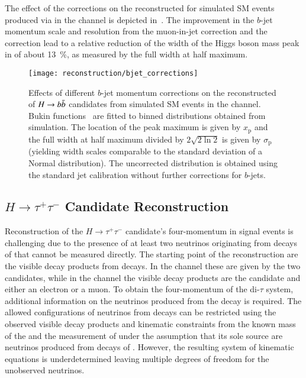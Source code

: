 The effect of the corrections on the reconstructed \mBB for simulated
SM \HH events produced via \ggF in the \hadhad channel is depicted
in~. The improvement in the $b$-jet
momentum scale and resolution from the muon-in-jet correction and the
\pTreco correction lead to a relative reduction of the width of the
Higgs boson mass peak in \mBB of about \SI{13}{\percent}, as measured
by the full width at half maximum.

\begin{figure}[htbp]
  \centering

  \texttt{[image: reconstruction/bjet\_corrections]}

  \caption{Effects of different $b$-jet momentum corrections on the
    reconstructed \mBB of $H \to b\bar{b}$ candidates from simulated SM
    \HH events in the \hadhad channel. Bukin
    functions~\cite{Bukin:2007zha} are fitted
    to binned distributions obtained from simulation. The location of
    the peak maximum is given by $x_{\text{p}}$ and the full width at
    half maximum divided by $2\sqrt{2 \ln 2}$ is given by
    $\sigma_{\text{p}}$ (yielding width scales comparable to the
    standard deviation of a Normal distribution). The uncorrected
    distribution is obtained using the standard jet calibration
    without further corrections for $b$-jets.}%
  \label{fig:bjet_momentum_corr_mbb}
\end{figure}


\subsection{$H \to \tau^{+}\tau^{-}$ Candidate Reconstruction}%
\label{sec:htautau_reco}


Reconstruction of the $H \to \tau^{+}\tau^{-}$ candidate's
four-momentum in signal events is challenging due to the presence of
at least two neutrinos originating from decays of \tauleptons that
cannot be measured directly. The starting point of the reconstruction
are the visible decay products from \taulepton decays. In the \hadhad
channel these are given by the two \tauhadvis candidates, while in the
\lephad channel the visible decay products are the \tauhadvis
candidate and either an electron or a muon. To obtain the
four-momentum of the di-$\tau$ system, %
additional information on the neutrinos produced from the \taulepton
decay is required. The allowed configurations of neutrinos from
\taulepton decays can be restricted using the observed visible decay
products and kinematic constraints from the known mass of the
\taulepton and the measurement of \pTmiss under the assumption that
its sole source are neutrinos produced from decays of
\tauleptons. However, the resulting system of kinematic equations is
underdetermined leaving multiple degrees of freedom for the unobserved
neutrinos.

